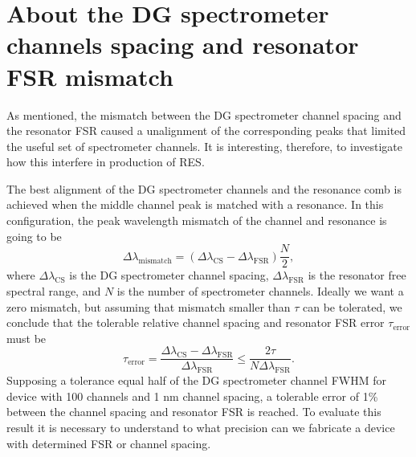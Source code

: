 \documentclass[12pt,twoside,english]{book}
\renewcommand{\~}{\perispomeni}%
\numberwithin{equation}{section}
\numberwithin{figure}{section}
\newcommand\fnurl[2]{%
 \href{#2}{#1}\footnote{\url{#2}}%
}
\begin{document}
\section{About the DG spectrometer channels spacing and resonator FSR mismatch}
As mentioned, the mismatch between the DG spectrometer channel spacing and the resonator FSR caused a unalignment of the corresponding peaks that limited the useful set of spectrometer channels. It is interesting, therefore, to investigate how this interfere in production of RES.

The best alignment of the DG spectrometer channels and the resonance comb is achieved when the middle channel peak is matched with a resonance. In this configuration, the peak wavelength mismatch of the channel and resonance is going to be
\begin{equation}
\Delta\lambda_{\text{mismatch}}=\left(\Delta\lambda_{\text{CS}}-\Delta\lambda_{\text{FSR}}\right)\frac{N}{2},
\label{eq:missmatch}
\end{equation}
where $\Delta\lambda_{\text{CS}}$ is the DG spectrometer channel spacing, $\Delta\lambda_{\text{FSR}}$ is the resonator free spectral range, and $N$ is the number of spectrometer channels. Ideally we want a zero mismatch, but assuming that mismatch smaller than $\tau$ can be tolerated, we conclude that the tolerable relative channel spacing and resonator FSR error $\tau_{\text{error}}$ must be
\begin{equation}
\tau_{\text{error}}=\frac{\Delta\lambda_{\text{CS}}-\Delta\lambda_{\text{FSR}}}{\Delta\lambda_{\text{FSR}}}\le\frac{2\tau}{N\Delta\lambda_{\text{FSR}}}.
\label{eq:tolerable error}
\end{equation}
Supposing a tolerance equal half of the DG spectrometer channel FWHM for device with 100 channels and 1 nm channel spacing, a tolerable error of 1\% between the channel spacing and resonator FSR is reached.
To evaluate this result it is necessary to understand to what precision can we fabricate a device with determined FSR or channel spacing.

%
%
\end{document}
